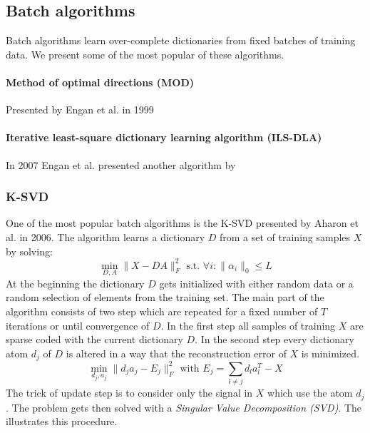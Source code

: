 \subsection{Batch algorithms}
Batch algorithms learn over-complete dictionaries from fixed batches of
training data. We present some of the most popular of these algorithms.

\paragraph{Method of optimal directions (MOD)}
Presented by Engan et al. in 1999\cite{Engan1999a} 

\paragraph{Iterative least-square dictionary learning algorithm (ILS-DLA)}
In 2007 Engan et al.\cite{Engan2007} presented another algorithm by   


\subsubsection{K-SVD}
\label{sec:k-svd}
One of the most popular batch algorithms is the K-SVD presented by
Aharon et al. in 2006\cite{Aharon2006}. The algorithm learns a dictionary $D$
from a set of training samples $X$ by solving:
\begin{equation*}
\min_{D,A} \lVert X - DA \rVert^{2}_{F} \textrm{ s.t. }
\forall i : \lVert \alpha_i \rVert_{0} \leq L
\end{equation*}
At the beginning the dictionary $D$ gets initialized with either random data or
a random selection of elements from the training set. The main part of the
algorithm consists of two step which are repeated for a fixed number of $T$
iterations or until convergence of $D$. In the first step all samples of
training $X$ are sparse coded with the current dictionary $D$. In the second
step every dictionary atom $d_j$ of $D$ is altered in a way that the
reconstruction error of $X$ is minimized. 
\begin{equation*}
\min_{d_j,a_j} \lVert d_ja_j - E_j \rVert^{2}_{F} \textrm{ with }
E_j = \sum_{l\neq j} d_la_l^T - X
\end{equation*} 
The trick of update step is to consider only the signal in $X$ which use the
atom $d_j$. The problem gets then solved with a \emph{Singular Value
Decomposition (SVD)}. 
The  illustrates this procedure. 

